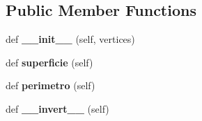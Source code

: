 \subsection*{Public Member Functions}
\begin{DoxyCompactItemize}
\item 
\mbox{\label{class_imports_1_1_figura_1_1_figura_aaa458b536620df574884261aa144d183}} 
def {\bfseries \+\_\+\+\_\+init\+\_\+\+\_\+} (self, vertices)
\item 
\mbox{\label{class_imports_1_1_figura_1_1_figura_afcc51e34f169a106e916a051f0810759}} 
def {\bfseries superficie} (self)
\item 
\mbox{\label{class_imports_1_1_figura_1_1_figura_a8cfd4e942807c83b892f9186bdee589f}} 
def {\bfseries perimetro} (self)
\item 
\mbox{\label{class_imports_1_1_figura_1_1_figura_a5986aa7e93785f2bb181f2cc0e20c3b2}} 
def {\bfseries \+\_\+\+\_\+invert\+\_\+\+\_\+} (self)
\end{DoxyCompactItemize}

